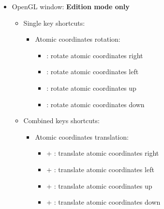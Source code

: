 {\begin{itemize}
\begin{itemize}
\begin{itemize}
\begin{itemize}
\item[] \Ctrl +  : stop spinning 
\end{itemize}
\end{itemize}
\end{itemize}
\item OpenGL window: {\bf{Edition mode only}}
\begin{itemize}
\item Single key shortcuts: 
\begin{itemize}
\item Atomic coordinates rotation: 
\begin{itemize}
\item[] \RArrow : rotate atomic coordinates right
\item[] \LArrow : rotate atomic coordinates left
\item[] \UArrow : rotate atomic coordinates up
\item[] \DArrow : rotate atomic coordinates down
\end{itemize}
\end{itemize}
\item Combined keys shortcuts: 
\begin{itemize}
\item Atomic coordinates translation: 
\begin{itemize}
\item[] \Ctrl + \RArrow : translate atomic coordinates right
\item[] \Ctrl + \LArrow : translate atomic coordinates left
\item[] \Ctrl + \UArrow : translate atomic coordinates up
\item[] \Ctrl + \DArrow : translate atomic coordinates down
\end{itemize}
\end{itemize}
\end{itemize}
\end{itemize}}
